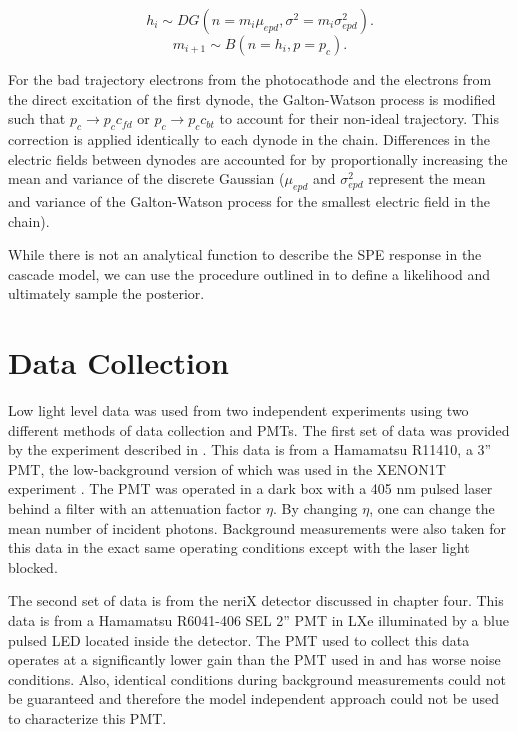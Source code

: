 \begin{equation}
\label{gw_1}
h_{i} \sim DG(n=m_{i} \mu_{epd}, \sigma^2 = m_{i} \sigma^2_{epd}).
\end{equation}
\begin{equation}
\label{gw_2}
m_{i+1} \sim B(n=h_{i}, p=p_{c}).
\end{equation}

For the bad trajectory electrons from the photocathode and the electrons from the direct excitation of the first dynode, the Galton-Watson process is modified such that $p_{c} \rightarrow p_{c} c_{fd}$ or $p_{c} \rightarrow p_{c} c_{bt}$ to account for their non-ideal trajectory.  This correction is applied identically to each dynode in the chain.  Differences in the electric fields between dynodes are accounted for by proportionally increasing the mean and variance of the discrete Gaussian ($\mu_{epd}$ and $\sigma^2_{epd}$ represent the mean and variance of the Galton-Watson process for the smallest electric field in the chain).

While there is not an analytical function to describe the SPE response in the cascade model, we can use the procedure outlined in  to define a likelihood and ultimately sample the posterior.


\section{Data Collection}


Low light level data was used from two independent experiments using two different methods of data collection and PMTs.  The first set of data was provided by the experiment described in .  This data is from a Hamamatsu R11410, a 3'' PMT, the low-background version of which was used in the XENON1T experiment \cite{aprile2016physics}. The PMT was operated in a dark box with a 405 nm pulsed laser behind a filter with an attenuation factor $\eta$.  By changing $\eta$, one can change the mean number of incident photons.  Background measurements were also taken for this data in the exact same operating conditions except with the laser light blocked.

The second set of data is from the neriX detector discussed in chapter four.  This data is from a Hamamatsu R6041-406 SEL 2'' PMT in LXe illuminated by a blue pulsed LED located inside the detector.  The PMT used to collect this data operates at a significantly lower gain than the PMT used in  and has worse noise conditions.  Also, identical conditions during background measurements could not be guaranteed and therefore the model independent approach could not be used to characterize this PMT.

